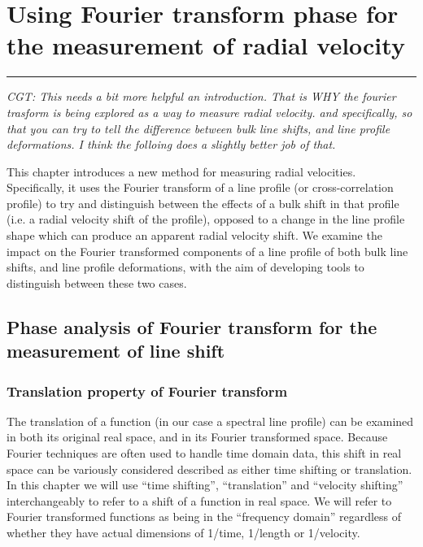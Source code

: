 \chapter{Using Fourier transform phase for the measurement of radial velocity}
\label{\thechapter}
\label{ch:Methods}


\rule{\textwidth}{1.6pt}
\minitoc
\clearpage


{\em CGT: This needs a bit more helpful an introduction. That is WHY the fourier trasform is being explored as
a way to measure radial velocity. and specifically, so that you can try to tell the difference between bulk line shifts, and line profile deformations.
I think the folloing does a slightly better job of that.}

This chapter introduces a new method for measuring radial velocities. Specifically, it uses the Fourier transform
of a line profile (or cross-correlation profile) to try and distinguish between the effects of a bulk shift in that profile
(i.e. a radial velocity shift of the profile), opposed to a change in the line profile shape which can produce an
apparent radial velocity shift. We examine the impact on the Fourier transformed components of a line profile of both bulk line shifts, and line profile deformations, with the aim of developing tools to distinguish between these two cases.



\section{Phase analysis of Fourier transform for the measurement of line shift}
\label{\thesection}
\label{ch:FT_line_shift}


\subsection{Translation property of Fourier transform}

The translation of a function (in our case a spectral line profile) can be examined in both its original real
space, and in its Fourier transformed space. Because Fourier techniques are often used to handle time domain data,
this shift in real space can be variously considered described as either time shifting or translation. In this chapter 
we will use ``time shifting'', ``translation'' and ``velocity shifting'' interchangeably to refer to a shift of a function
in real space. We will refer to Fourier transformed functions as being in the ``frequency domain'' regardless of whether they have actual dimensions of 1/time, 1/length or 1/velocity.


